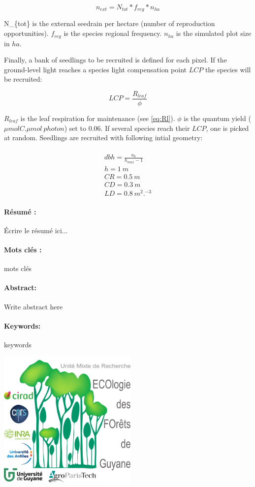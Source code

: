 \documentclass[12pt,]{article}
\theoremstyle{definition}
\theoremstyle{definition}
\theoremstyle{remark}
\begin{document}
\begin{equation}
  n_{ext} = N_{tot}*f_{reg}*n_{ha}
  \label{eq:next}
\end{equation}

N\_\{tot\} is the external seedrain per hectare (number of reproduction
opportunities). \(f_{reg}\) is the species regional frequency.
\(n_{ha}\) is the simulated plot size in \(ha\).

Finally, a bank of seedlings to be recruited is defined for each pixel.
If the ground-level light reaches a species light compensation point
\(LCP\) the species will be recruited:

\begin{equation}
  LCP = \frac{R_{leaf}}{\phi}
  \label{eq:LCP}
\end{equation}

\(R_{leaf}\) is the leaf respiration for maintenance (see \eqref{eq:Rl}).
\(\phi\) is the quantum yield (\(\mu mol C.\mu mol~photon\)) set to
0.06. If several species reach their \(LCP\), one is picked at random.
Seedlings are recruited with following intial geometry:

\begin{equation}
  \begin{array}{c} \\
    dbh = \frac{a_h}{h_{max} - 1}\\
    h = 1~m\\
    CR = 0.5~m\\
    CD = 0.3~m\\
    LD = 0.8~m^2.^{-3}
  \end{array}
  \label{eq:C}
\end{equation}


\listoftables
\listoffigures

  \newpage
  \paragraph{Résumé :}
  Écrire le résumé ici...
  \paragraph{Mots clés :} mots clés
  \newline\newline
  \paragraph{Abstract:}
  Write abstract here
  \paragraph{Keywords:} keywords
  
  \vspace*{\fill}
  \includegraphics{images/logo}
\end{document}
